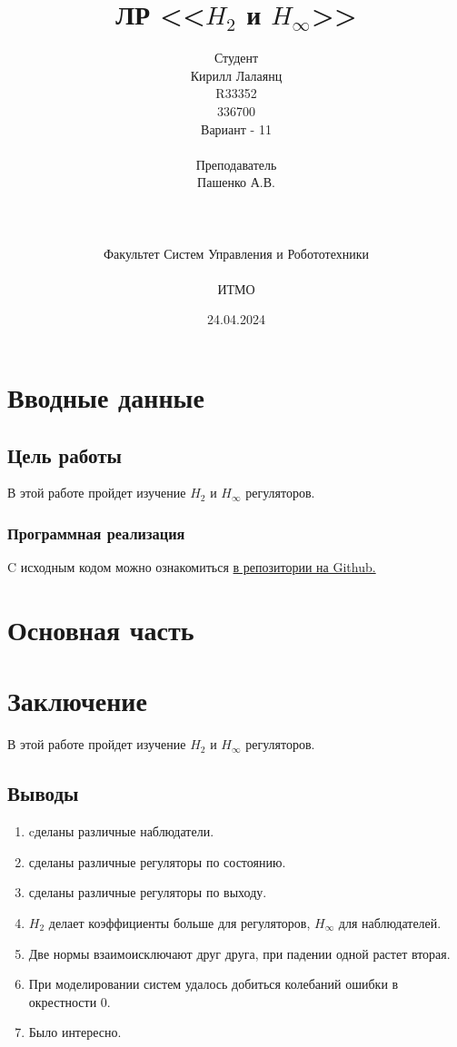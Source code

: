 \documentclass[16pt]{article}
\title{ЛР \textnumero 11 <<\(H_2\) и \(H_\infty\)>>}
\author{
Студент \\
Кирилл Лалаянц\\
R33352\\
336700\\
Вариант - 11\\
\\
Преподаватель\\
Пашенко А.В. \\
\\
\\
\\
Факультет Систем Управления и Робототехники\\
\\
ИТМО\\
}
\date{24.04.2024}
\begin{document}
\maketitle
\newpage
\tableofcontents
\thispagestyle{empty}

\newpage
\setcounter{page}{1}
\section{Вводные данные}
\subsection{Цель работы}
В этой работе пройдет изучение \(H_2\) и \(H_\infty\) регуляторов.

\subsubsection{Программная реализация}
C исходным кодом можно ознакомиться \href{https://github.com/lalayants/control-theory-itmo-2023-2024}{в репозитории на Github.}


\newpage
\section{Основная часть}

\FloatBarrier


\FloatBarrier


\FloatBarrier


\FloatBarrier


\FloatBarrier

\newpage
\section{Заключение}
В этой работе пройдет изучение \(H_2\) и \(H_\infty\) регуляторов.
\subsection{Выводы}
\begin{enumerate}
   \item cделаны различные наблюдатели.
   \item сделаны различные регуляторы по состоянию.
   \item сделаны различные регуляторы по выходу.
   \item \(H_2\) делает коэффициенты больше для регуляторов, \(H_\infty\) для наблюдателей.
   \item Две нормы взаимоисключают друг друга, при падении одной растет вторая. 
   \item При моделировании систем удалось добиться колебаний ошибки в окрестности 0. 
   \item Было интересно.
\end{enumerate}
\end{document}
